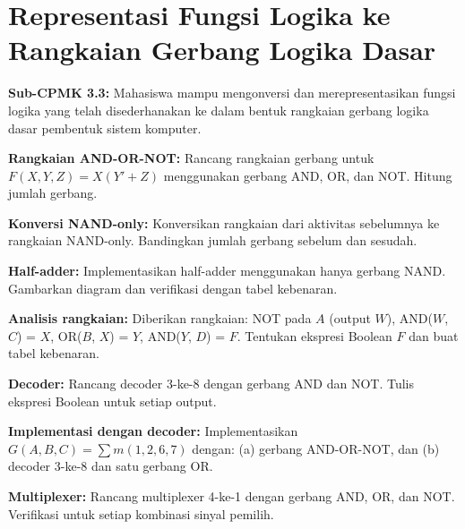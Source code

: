 \documentclass[../main]{subfiles}
\begin{document}
\chapter{Representasi Fungsi Logika ke Rangkaian Gerbang Logika Dasar}

\begin{subcpmk}
  \item \textbf{Sub-CPMK 3.3:} Mahasiswa mampu mengonversi dan merepresentasikan fungsi logika yang telah disederhanakan ke dalam bentuk rangkaian gerbang logika dasar pembentuk sistem komputer.
\end{subcpmk}










\begin{aktivitas}
  \item \textbf{Rangkaian AND-OR-NOT:} Rancang rangkaian gerbang untuk $F(X,Y,Z) = X(Y' + Z)$ menggunakan gerbang AND, OR, dan NOT. Hitung jumlah gerbang.
  \item \textbf{Konversi NAND-only:} Konversikan rangkaian dari aktivitas sebelumnya ke rangkaian NAND-only. Bandingkan jumlah gerbang sebelum dan sesudah.
  \item \textbf{Half-adder:} Implementasikan half-adder menggunakan hanya gerbang NAND. Gambarkan diagram dan verifikasi dengan tabel kebenaran.
  \item \textbf{Analisis rangkaian:} Diberikan rangkaian: NOT pada $A$ (output $W$), AND($W$, $C$) = $X$, OR($B$, $X$) = $Y$, AND($Y$, $D$) = $F$. Tentukan ekspresi Boolean $F$ dan buat tabel kebenaran.
  \item \textbf{Decoder:} Rancang decoder 3-ke-8 dengan gerbang AND dan NOT. Tulis ekspresi Boolean untuk setiap output.
  \item \textbf{Implementasi dengan decoder:} Implementasikan $G(A,B,C) = \sum m(1, 2, 6, 7)$ dengan: (a) gerbang AND-OR-NOT, dan (b) decoder 3-ke-8 dan satu gerbang OR.
  \item \textbf{Multiplexer:} Rancang multiplexer 4-ke-1 dengan gerbang AND, OR, dan NOT. Verifikasi untuk setiap kombinasi sinyal pemilih.
\end{aktivitas}
\end{document}
